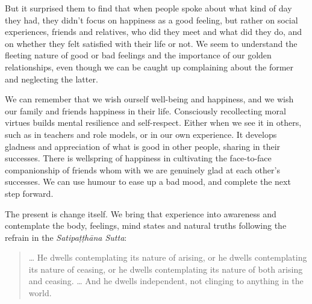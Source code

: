 But it surprised them to find that when people spoke about what kind of
day they had, they didn't focus on happiness as a good feeling, but
rather on social experiences, friends and relatives, who did they meet
and what did they do, and on whether they felt satisfied with their life
or not. We seem to understand the fleeting nature of good or bad
feelings and the importance of our golden relationships, even though we
can be caught up complaining about the former and neglecting the latter.

We can remember that we wish ourself well-being and happiness, and we
wish our family and friends happiness in their life. Consciously
recollecting moral virtues builds mental resilience and self-respect.
Either when we see it in others, such as in teachers and role models, or
in our own experience. It develops gladness and appreciation of what is
good in other people, sharing in their successes. There is wellspring of
happiness in cultivating the face-to-face companionship of friends whom
with we are genuinely glad at each other's successes. We can use humour
to ease up a bad mood, and complete the next step forward.

The present is change itself. We bring that experience into awareness
and contemplate the body, feelings, mind states and natural truths
following the refrain in the \emph{Satipaṭṭhāna Sutta}:

\begin{quote}
\ldots{} He dwells contemplating its nature of arising, or he dwells
contemplating its nature of ceasing, or he dwells contemplating its
nature of both arising and ceasing. \ldots{} And he dwells independent,
not clinging to anything in the world.

\bigskip

\end{quote}
